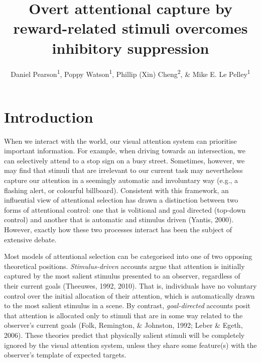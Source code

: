 \documentclass[man, a4paper, noextraspace, 11pt,floatsintext]{apa6}
\title{Overt attentional capture by reward-related stimuli overcomes inhibitory
suppression}
\author{Daniel Pearson\textsuperscript{1}, Poppy Watson\textsuperscript{1},
Phillip (Xin) Cheng\textsuperscript{2}, \& Mike E. Le
Pelley\textsuperscript{1}}
\date{}
\affiliation{
\vspace{0.5cm}
\textsuperscript{1} School of Psychology, UNSW Sydney\\\textsuperscript{2} Department of Cognitive Science, Macquarie University}
\begin{document}
\maketitle

\section{Introduction}\label{introduction}

When we interact with the world, our visual attention system can
prioritise important information. For example, when driving towards an
intersection, we can selectively attend to a stop sign on a busy street.
Sometimes, however, we may find that stimuli that are irrelevant to our
current task may nevertheless capture our attention in a seemingly
automatic and involuntary way (e.g., a flashing alert, or colourful
billboard). Consistent with this framework, an influential view of
attentional selection has drawn a distinction between two forms of
attentional control: one that is volitional and goal directed (top-down
control) and another that is automatic and stimulus driven (Yantis,
2000). However, exactly how these two processes interact has been the
subject of extensive debate.

Most models of attentional selection can be categorised into one of two
opposing theoretical positions. \emph{Stimulus-driven} accounts argue
that attention is initially captured by the most salient stimulus
presented to an observer, regardless of their current goals (Theeuwes,
1992, 2010). That is, individuals have no voluntary control over the
initial allocation of their attention, which is automatically drawn to
the most salient stimulus in a scene. By contrast, \emph{goal-directed}
accounts posit that attention is allocated only to stimuli that are in
some way related to the observer's current goals (Folk, Remington, \&
Johnston, 1992; Leber \& Egeth, 2006). These theories predict that
physically salient stimuli will be completely ignored by the visual
attention system, unless they share some feature(s) with the observer's
template of expected targets.
\end{document}
